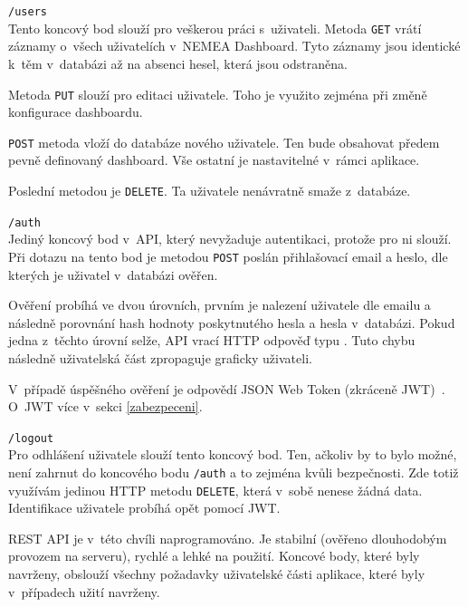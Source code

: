 \begin{description}
    \item \texttt{/users}\\
        Tento koncový bod slouží pro veškerou práci s~uživateli. Metoda \texttt{GET} vrátí záznamy o~všech uživatelích v~NEMEA Dashboard. Tyto záznamy jsou identické k~těm v~databázi až na absenci hesel, která jsou odstraněna.

        Metoda \texttt{PUT} slouží pro editaci uživatele. Toho je využito zejména při změně konfigurace dashboardu.

        \texttt{POST} metoda vloží do databáze nového uživatele. Ten bude obsahovat předem pevně definovaný dashboard. Vše ostatní je nastavitelné v~rámci aplikace.

        Poslední metodou je \texttt{DELETE}. Ta uživatele nenávratně smaže z~databáze.

    \item \texttt{/auth}\\
        Jediný koncový bod v~API, který nevyžaduje autentikaci, protože pro ni slouží. Při dotazu na tento bod je metodou \texttt{POST} poslán přihlašovací email a heslo, dle kterých je uživatel v~databázi ověřen.

        Ověření probíhá ve dvou úrovních, prvním je nalezení uživatele dle emailu a následně porovnání hash hodnoty poskytnutého hesla a hesla v~databázi. Pokud jedna z~těchto úrovní selže, API vrací HTTP odpověď typu . Tuto chybu následně uživatelská část zpropaguje graficky uživateli.

        V~případě úspěšného ověření je odpovědí JSON Web Token (zkráceně JWT)~\cite{rfc:jwt}. O~JWT více v~sekci \ref{zabezpeceni}.

    \item \texttt{/logout}\\
        Pro odhlášení uživatele slouží tento koncový bod. Ten, ačkoliv by to bylo možné, není zahrnut do koncového bodu \texttt{/auth} a to zejména kvůli bezpečnosti. Zde totiž využívám jedinou HTTP metodu \texttt{DELETE}, která v~sobě nenese žádná data. Identifikace uživatele probíhá opět pomocí JWT.
\end{description}

REST API je v~této chvíli naprogramováno. Je stabilní (ověřeno dlouhodobým provozem na serveru), rychlé a lehké na použití. Koncové body, které byly navrženy, obslouží všechny požadavky uživatelské části aplikace, které byly v~případech užití navrženy.

